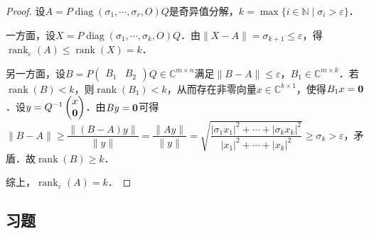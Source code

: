 \documentclass[a4paper,fontset=windows]{ctexbook}
\theoremstyle{definition}
\DeclareMathOperator{\diag}{diag}
\DeclareMathOperator{\rank}{rank}
\renewcommand{\le}{\leqslant}
\renewcommand{\ge}{\geqslant}
\begin{document}
\begin{proof}
设$A=P\diag(\sigma_1,\cdots,\sigma_r,O)Q$是奇异值分解，$k=\max\{i\in\mathbb{N}\mid\sigma_i>\varepsilon\}$．

一方面，设$X=P\diag(\sigma_1,\cdots,\sigma_k,O)Q$．由$\|X-A\|=\sigma_{k+1}\le\varepsilon$，得$\rank_\varepsilon(A)\le\rank(X)=k$．

另一方面，设$B=P\begin{pmatrix}B_1&B_2\end{pmatrix}Q\in\mathbb{C}^{m\times n}$满足$\|B-A\|\le\varepsilon$，$B_1\in\mathbb{C}^{m\times k}$．若$\rank(B)<k$，则$\rank(B_1)<k$，从而存在非零向量$x\in\mathbb{C}^{k\times 1}$，使得$B_1x={\bf 0}$．设$y=Q^{-1}\begin{pmatrix}x \\ {\bf 0}\end{pmatrix}$．由$By={\bf 0}$可得$\|B-A\|\ge\dfrac{\|(B-A)y\|}{\|y\|}=\dfrac{\|Ay\|}{\|y\|}=\sqrt{\dfrac{|\sigma_1x_1|^2+\cdots+|\sigma_kx_k|^2}{|x_1|^2+\cdots+|x_k|^2}}\ge\sigma_k>\varepsilon$，矛盾．故$\rank(B)\ge k$．

综上，$\rank_\varepsilon(A)=k$．
\end{proof}

\subsection*{习题}
\end{document}
